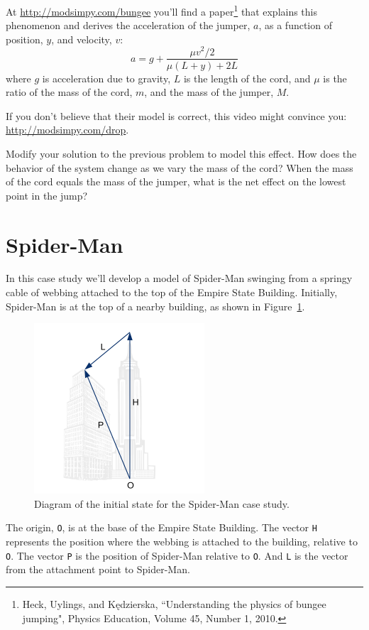 \documentclass[
]{book}
\numberwithin{Answer}{chapter}
\numberwithin{Exercise}{chapter}
\begin{document}
At \url{http://modsimpy.com/bungee} you'll find a paper\footnote{Heck, Uylings, and Kędzierska, ``Understanding the physics of bungee jumping", Physics Education, Volume 45, Number 1, 2010.} that explains this phenomenon and derives the acceleration of the jumper, $a$, as a function of position, $y$, and velocity, $v$:
%
\[ a = g + \frac{\mu v^2/2}{\mu(L+y) + 2L} \] 
%
where $g$ is acceleration due to gravity, $L$ is the length of the cord, and $\mu$ is the ratio of the mass of the cord, $m$, and the mass of the jumper, $M$.

If you don't believe that their model is correct, this video might convince you: \url{http://modsimpy.com/drop}.

Modify your solution to the previous problem to model this effect.  How does the behavior of the system change as we vary the mass of the cord?  When the mass of the cord equals the mass of the jumper, what is the net effect on the lowest point in the jump?


\section{Spider-Man}

In this case study we'll develop a model of Spider-Man swinging from a
springy cable of webbing attached to the top of the Empire State
Building.  Initially, Spider-Man is at the top of a nearby building, as
shown in Figure~\ref{spiderman}.


\begin{figure}
\centerline{\includegraphics[height=2.5in]{figs/spiderman.pdf}}
\caption{Diagram of the initial state for the Spider-Man case study.}
\label{spiderman}
\end{figure}

The origin, {\tt O}, is at the base of the Empire State Building. The
vector {\tt H} represents the position where the webbing is attached
to the building, relative to {\tt O}. The vector {\tt P} is the
position of Spider-Man relative to {\tt O}. And {\tt L} is the
vector from the attachment point to Spider-Man.
\end{document}
